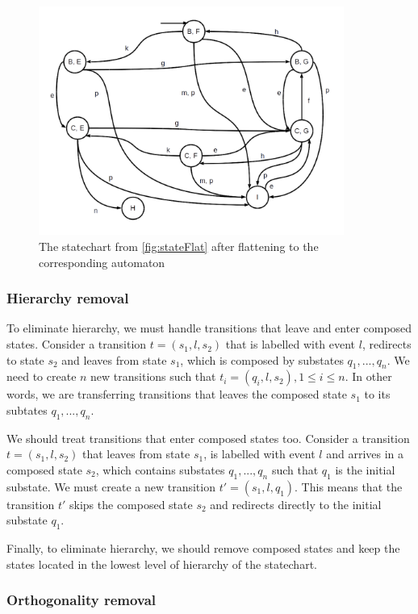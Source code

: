 \begin{figure}[htb]
\centering
\includegraphics[width=10cm]{figuras/flatState}
\caption{\label{fig:flatStateNFA} The statechart from \ref{fig:stateFlat} after flattening to the corresponding automaton}
\end{figure}

\subsubsection{Hierarchy removal}

To eliminate hierarchy, we must handle transitions that leave and enter composed states. Consider a transition $t = (s_1,l,s_2)$ that is labelled with event $l$, redirects to state $s_2$ and leaves from state $s_1$, which is composed by substates $q_1,...,q_n$. We need to create $n$ new transitions such that $t_i = (q_i,l,s_2), 1 \leq i \leq n$. In other words, we are transferring transitions that leaves the composed state $s_1$ to its subtates $q_1,...,q_n$.

We should treat transitions that enter composed states too. Consider a transition $t = (s_1,l,s_2)$ that leaves from state $s_1$, is labelled with event $l$ and arrives in a composed state $s_2$, which contains substates $q_1,...,q_n$ such that $q_1$ is the initial substate. We must create a new transition $t' = (s_1,l,q_1)$. This means that the transition $t'$ skips the composed state $s_2$ and redirects directly to the initial substate $q_1$.

Finally, to eliminate hierarchy, we should remove composed states and keep the states located in the lowest level of hierarchy of the statechart. 

\subsubsection{Orthogonality removal}

